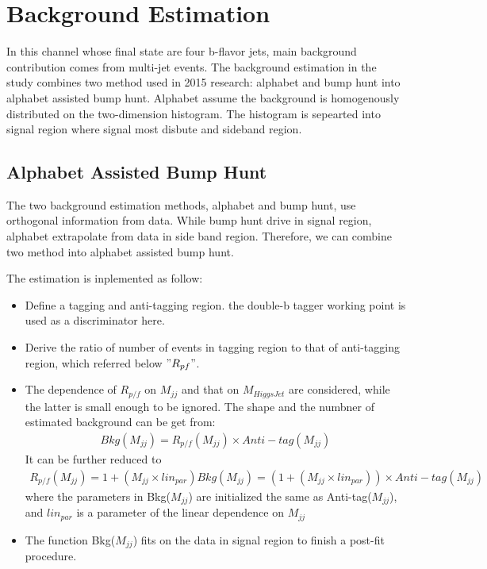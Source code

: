 
\chapter{Background Estimation} \label{Background}
In this channel whose final state are four b-flavor jets, main background contribution comes from multi-jet events.
The background estimation in the study combines two method used in 2015 research: alphabet and bump hunt into alphabet assisted bump hunt.
Alphabet assume the background is homogenously distributed on the two-dimension histogram.
The histogram is sepearted into signal region where signal most disbute and sideband region. 

\section{Alphabet Assisted Bump Hunt}
The two background estimation methods, alphabet and bump hunt, use orthogonal information from data.
While bump hunt drive in signal region, alphabet extrapolate from data in side band region. 
Therefore, we can combine two method into alphabet assisted bump hunt.

The estimation is inplemented as follow:
\begin{itemize}
\item Define a tagging and anti-tagging region. the double-b tagger working point is used as a discriminator here.
\item Derive the ratio of number of events in tagging region to that of anti-tagging region, which referred below $" R_{p\/f} "$.
\item The dependence of $R_{p/f}$ on $M_{jj}$ and that on $M_{Higgs Jet}$ are considered, while the latter is small enough to be ignored. The shape and the numbner of estimated background can be get from:
\begin{equation} \label{eq1}
\begin{split}
Bkg(M_{jj})= R_{p/f}(M_{jj}) \times Anti-tag(M_{jj})
\end{split}
\end{equation}
It can be further reduced to 
\begin{equation} \label{eq1}
\begin{split}
R_{p/f}(M_{jj})= 1+(M_{jj} \times lin_{par})
Bkg(M_{jj})= (1+(M_{jj} \times lin_{par})) \times Anti-tag(M_{jj})
\end{split}
\end{equation}
where the parameters in Bkg($M_{jj}$) are initialized the same as Anti-tag($M_{jj}$), and $lin_{par}$ is a parameter of the linear dependence on $M_{jj}$
\item  The function Bkg($M_{jj}$) fits on the data in signal region to finish a post-fit procedure. 

\end{itemize}